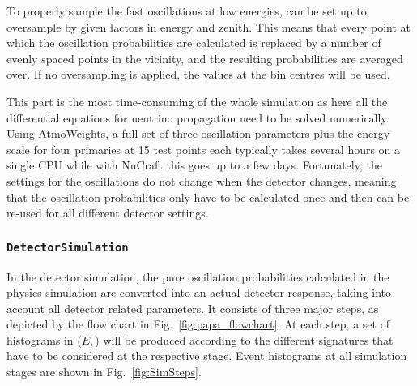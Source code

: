 
To properly sample the fast oscillations at low energies, \papa can be set up
to oversample by given factors in energy and zenith. This means that every
point at which the oscillation probabilities are calculated is replaced by a
number of evenly spaced points in the vicinity, and the resulting probabilities
are averaged over. If no oversampling is applied, the values at the bin
centres will be used.

This part is the most time-consuming of the whole simulation as here all the
differential equations for neutrino propagation need to be solved numerically.
Using AtmoWeights, a full set of three oscillation parameters plus the energy
scale for four primaries at 15 test points each typically takes several hours
on a single CPU while with NuCraft this goes up to a few days. Fortunately, the
settings for the oscillations do not change when the detector changes, meaning
that the oscillation probabilities only have to be calculated once and then can
be re-used for all different detector settings.


\subsubsection{\texttt{DetectorSimulation}}

In the detector simulation, the pure oscillation probabilities calculated in the
physics simulation are converted into an actual detector response, taking into
account all detector related parameters. It consists of three major steps, as
depicted by the flow chart in Fig.~\ref{fig:papa_flowchart}. At each step, a set
of histograms in ($E$,\,\coszen) will be produced according to the
different signatures that have to be considered at the respective stage. Event
histograms at all simulation stages are shown in Fig.~\ref{fig:SimSteps}.

